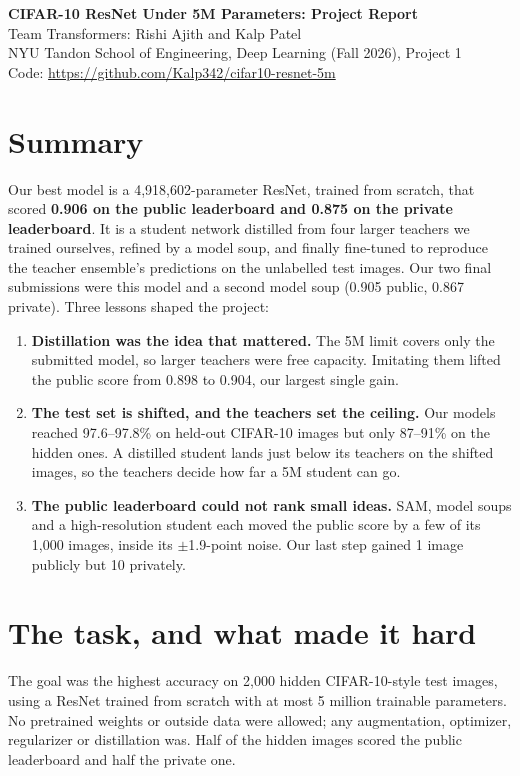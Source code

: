 \documentclass[11pt]{article}
\begin{document}
\begin{center}
{\LARGE\bfseries CIFAR-10 ResNet Under 5M Parameters: Project Report}\\[6pt]
{\large Team Transformers: Rishi Ajith and Kalp Patel}\\[2pt]
NYU Tandon School of Engineering, Deep Learning (Fall 2026), Project 1\\[2pt]
Code: \url{https://github.com/Kalp342/cifar10-resnet-5m}
\end{center}

\section*{Summary}
Our best model is a 4,918,602-parameter ResNet, trained from scratch, that scored \textbf{0.906 on the public leaderboard and 0.875 on the private leaderboard}. It is a student network distilled from four larger teachers we trained ourselves, refined by a model soup, and finally fine-tuned to reproduce the teacher ensemble's predictions on the unlabelled test images. Our two final submissions were this model and a second model soup (0.905 public, 0.867 private). Three lessons shaped the project:
\begin{enumerate}
\item \textbf{Distillation was the idea that mattered.} The 5M limit covers only the submitted model, so larger teachers were free capacity. Imitating them lifted the public score from 0.898 to 0.904, our largest single gain.
\item \textbf{The test set is shifted, and the teachers set the ceiling.} Our models reached 97.6--97.8\% on held-out CIFAR-10 images but only 87--91\% on the hidden ones. A distilled student lands just below its teachers on the shifted images, so the teachers decide how far a 5M student can go.
\item \textbf{The public leaderboard could not rank small ideas.} SAM, model soups and a high-resolution student each moved the public score by a few of its 1,000 images, inside its $\pm$1.9-point noise. Our last step gained 1 image publicly but 10 privately.
\end{enumerate}

\section{The task, and what made it hard}
The goal was the highest accuracy on 2,000 hidden CIFAR-10-style test images, using a ResNet trained from scratch with at most 5 million trainable parameters. No pretrained weights or outside data were allowed; any augmentation, optimizer, regularizer or distillation was. Half of the hidden images scored the public leaderboard and half the private one.
\end{document}
